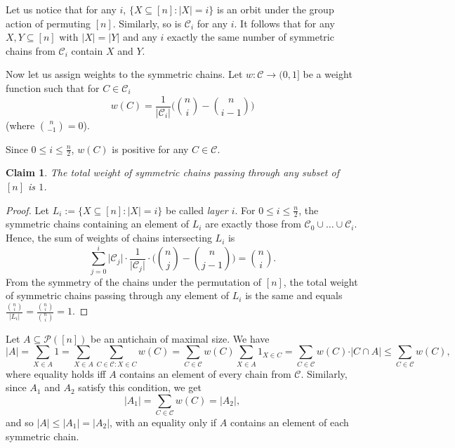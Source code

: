 \documentclass[11pt, reqno]{amsart}
\newtheorem*{claim}{Claim}
\theoremstyle{remark}
\numberwithin{equation}{section}
\begin{document}
Let us notice that for any $i$, $\{X \subseteq [n]: \vert X\vert =i\}$ is an orbit under the group action of permuting $[n]$. Similarly, so is $\mathcal{C}_i$ for any $i$. It follows that for any $X, Y \subseteq [n]$ with $\vert X\vert =\vert Y\vert $ and any $i$ exactly the same number of symmetric chains from $\mathcal{C}_i$ contain $X$ and $Y$.

Now let us assign weights to the symmetric chains. Let $w: \mathcal{C} \rightarrow (0, 1]$ be a weight function such that for $C \in \mathcal{C}_i$
\begin{equation}
    w(C) = \frac{1}{\vert \mathcal{C}_i\vert } \Big(\binom{n}{i} - \binom{n}{i-1}\Big)
\end{equation}
(where $\binom{n}{-1}=0$).

Since $0 \leqslant i \leqslant \frac{n}{2}$, $w(C)$ is positive for any $C \in \mathcal{C}$.

\begin{claim}
    The total weight of symmetric chains passing through any subset of $[n]$ is $1$.
\end{claim}

\begin{proof}
    Let $L_i := \{X \subseteq [n]: \vert X\vert =i\}$ be called \emph{layer $i$}. For $0 \leqslant i \leqslant \frac{n}{2}$, the symmetric chains containing an element of $L_i$ are exactly those from $\mathcal{C}_0 \cup \ldots \cup \mathcal{C}_i$. Hence, the sum of weights of chains intersecting $L_i$ is
    \begin{equation*}
        \sum_{j=0}^i \vert \mathcal{C}_j\vert  \cdot \frac{1}{\vert \mathcal{C}_j\vert } \cdot \Big( \binom{n}{j}-\binom{n}{j-1} \Big)=\binom{n}{i}.
    \end{equation*}
    From the symmetry of the chains under the permutation of $[n]$, the total weight of symmetric chains passing through any element of $L_i$ is the same and equals $\frac{\binom{n}{i}}{\vert L_i\vert }=\frac{\binom{n}{i}}{\binom{n}{i}}=1$.
\end{proof}

Let $A \subseteq \mathcal{P}([n])$ be an antichain of maximal size. We have
\begin{equation}
    \vert A\vert  = \sum_{X \in A} 1 = \sum_{X \in A} \sum_{C \in \mathcal{C}: X \in C} w(C) = \sum_{C \in \mathcal{C}} w(C) \sum_{X \in A} 1_{X \in C} = \sum_{C \in \mathcal{C}} w(C) \cdot \vert C \cap A\vert  \leqslant \sum_{C \in \mathcal{C}} w(C),
\end{equation}
where equality holds iff $A$ contains an element of every chain from $\mathcal{C}$. Similarly, since $A_1$ and $A_2$ satisfy this condition, we get
\begin{equation}
    \vert A_1\vert =\sum_{C \in \mathcal{C}} w(C) = \vert A_2\vert ,
\end{equation}
and so $\vert A\vert  \leqslant \vert A_1\vert  = \vert A_2\vert $, with an equality only if $A$ contains an element of each symmetric chain.
\end{document}
